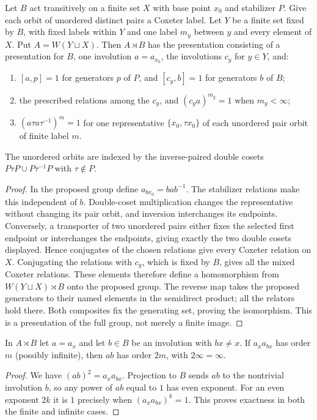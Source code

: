 \begin{proposition}\label{prop:orbital}
Let $B$ act transitively on a finite set $X$ with base point $x_0$ and stabilizer $P$. Give each orbit of unordered distinct pairs a Coxeter label. Let $Y$ be a finite set fixed by $B$, with fixed labels within $Y$ and one label $m_y$ between $y$ and every element of $X$. Put $A=W(Y\sqcup X)$. Then $A\rtimes B$ has the presentation consisting of a presentation for $B$, one involution $a=a_{x_0}$, the involutions $c_y$ for $y\in Y$, and:
\begin{enumerate}
\item $[a,p]=1$ for generators $p$ of $P$, and $[c_y,b]=1$ for generators $b$ of $B$;
\item the prescribed relations among the $c_y$, and $(c_ya)^{m_y}=1$ when $m_y<\infty$;
\item $(a\tau a\tau^{-1})^{m}=1$ for one representative $\{x_0,\tau x_0\}$ of each unordered pair orbit of finite label $m$.
\end{enumerate}
The unordered orbits are indexed by the inverse-paired double cosets $P\tau P\cup P\tau^{-1}P$ with $\tau\notin P$.
\end{proposition}
\begin{proof}
In the proposed group define $a_{bx_0}=bab^{-1}$. The stabilizer relations make this independent of $b$. Double-coset multiplication changes the representative without changing its pair orbit, and inversion interchanges its endpoints. Conversely, a transporter of two unordered pairs either fixes the selected first endpoint or interchanges the endpoints, giving exactly the two double cosets displayed. Hence conjugates of the chosen relations give every Coxeter relation on $X$. Conjugating the relations with $c_y$, which is fixed by $B$, gives all the mixed Coxeter relations. These elements therefore define a homomorphism from $W(Y\sqcup X)\rtimes B$ onto the proposed group. The reverse map takes the proposed generators to their named elements in the semidirect product; all the relators hold there. Both composites fix the generating set, proving the isomorphism. This is a presentation of the full group, not merely a finite image.
\end{proof}

\begin{lemma}\label{lem:double}
In $A\rtimes B$ let $a=a_x$ and let $b\in B$ be an involution with $bx\ne x$. If $a_xa_{bx}$ has order $m$ (possibly infinite), then $ab$ has order $2m$, with $2\infty=\infty$.
\end{lemma}
\begin{proof}
We have $(ab)^2=a_xa_{bx}$. Projection to $B$ sends $ab$ to the nontrivial involution $b$, so any power of $ab$ equal to $1$ has even exponent. For an even exponent $2k$ it is $1$ precisely when $(a_xa_{bx})^k=1$. This proves exactness in both the finite and infinite cases.
\end{proof}


